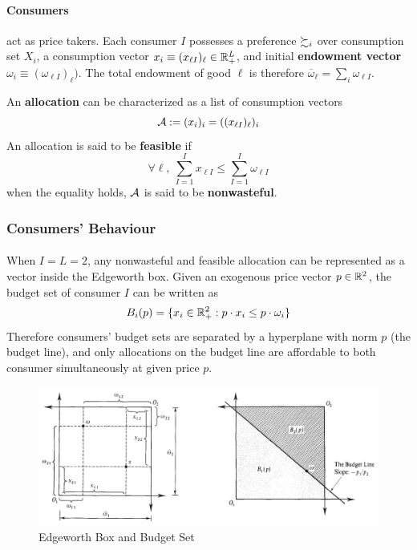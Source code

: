 \documentclass{report}
\begin{document}
		\paragraph{Consumers} act as price takers. Each consumer $I$ possesses a preference $\succsim_i$ over consumption set $X_i$, a consumption vector $x_i \equiv (x_{\ell I})_\ell \in \mathbb{R}^L_+$, and initial \textbf{endowment vector} $\omega_i \equiv (\omega_{\ell I})_\ell)$. The total endowment of good $\ell$ is therefore $\overline{\omega}_\ell = \sum_i \omega_{\ell I}$.
		\begin{definition}
			An \textbf{allocation} can be characterized as a list of consumption vectors
			\begin{equation}
				\mathcal{{A}} := (x_i)_i = ((x_{\ell I})_\ell)_i
			\end{equation}
			An allocation is said to be \textbf{feasible} if 
			\begin{equation}
				\forall \ell,\ \sum_{I=1}^I x_{\ell I} \leq \sum_{I=1}^I \omega_{\ell I}
			\end{equation}
			when the equality holds, $\mathcal{{A}}$ is said to be \textbf{nonwasteful}.
		\end{definition}
		
		\subsubsection{Consumers' Behaviour}
		\paragraph{} When $I=L=2$, any nonwasteful and feasible allocation can be represented as a vector inside the Edgeworth box. Given an exogenous price vector $p \in \mathbb{R}^2$, the budget set of consumer $I$ can be written as 
		\begin{equation}
			B_i (p) = \{
				x_i \in \mathbb{R}^2_+: p \cdot x_i \leq p \cdot \omega_i
			\}
		\end{equation}
		Therefore consumers' budget sets are separated by a hyperplane with norm $p$ (the budget line), and only allocations on the budget line are affordable to both consumer simultaneously at given price $p$.
		
		\begin{figure}[h]
			\centering
			\includegraphics[width=0.8\linewidth]{figures/EWBox_Budget.png}
			\caption{Edgeworth Box and Budget Set}
		\end{figure}	
		
\end{document}
